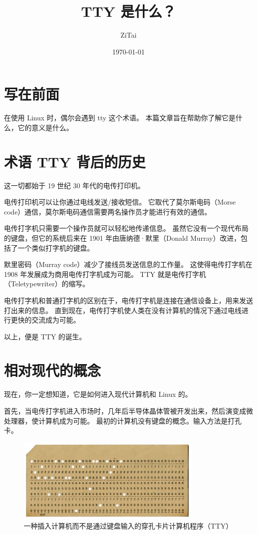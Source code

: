 \documentclass{ctexart}
\title{TTY 是什么？}
\author{ZiTai}
\date{\today}
\begin{document}
\maketitle

\clearpage
\tableofcontents

\clearpage
\section*{写在前面}
    在使用 Linux 时，偶尔会遇到 tty 这个术语。
    本篇文章旨在帮助你了解它是什么，它的意义是什么。

\clearpage
\section{术语 TTY 背后的历史}
    这一切都始于 19 世纪 30 年代的电传打印机。

    电传打印机可以让你通过电线发送/接收短信。
    它取代了莫尔斯电码（Morse code）通信，莫尔斯电码通信需要两名操作员才能进行有效的通信。

    电传打字机只需要一个操作员就可以轻松地传递信息。
    虽然它没有一个现代布局的键盘，但它的系统后来在 1901 年由唐纳德·默里（Donald Murray）改进，包括了一个类似打字机的键盘。

    默里密码（Murray code）减少了接线员发送信息的工作量。
    这使得电传打字机在 1908 年发展成为商用电传打字机成为可能。
    TTY 就是电传打字机（Teletypewriter）的缩写。

    电传打字机和普通打字机的区别在于，电传打字机是连接在通信设备上，用来发送打出来的信息。
    直到现在，电传打字机使人类在没有计算机的情况下通过电线进行更快的交流成为可能。

    以上，便是 TTY 的诞生。

\clearpage
\section{相对现代的概念}
    现在，你一定想知道，它是如何进入现代计算机和 Linux 的。

    首先，当电传打字机进入市场时，几年后半导体晶体管被开发出来，然后演变成微处理器，使计算机成为可能。
    最初的计算机没有键盘的概念。输入方法是打孔卡。

    \begin{figure}[htbp]
        \centering
        \includegraphics[width=0.80\textwidth]{images/punch-card-program.jpg}
        \caption{一种插入计算机而不是通过键盘输入的穿孔卡片计算机程序（TTY）}
    \end{figure}
\end{document}
